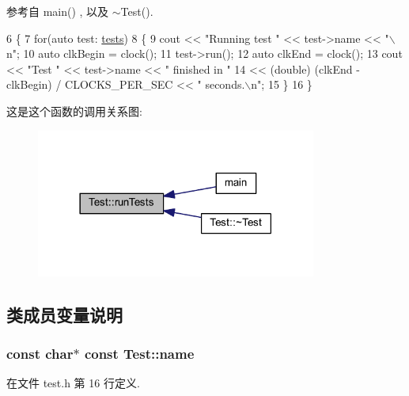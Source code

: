 参考自 main() , 以及 $\sim$\+Test().


\begin{DoxyCode}
6 \{
7     \textcolor{keywordflow}{for}(\textcolor{keyword}{auto} test: \hyperlink{classTest_ad03939a08980e2a62dd1d1cbcb13914c}{tests})
8     \{
9         cout << \textcolor{stringliteral}{"Running test "} << test->name << \textcolor{stringliteral}{"\(\backslash\)n"};
10         \textcolor{keyword}{auto} clkBegin = clock();
11         test->run();
12         \textcolor{keyword}{auto} clkEnd = clock();
13         cout << \textcolor{stringliteral}{"Test "} << test->name << \textcolor{stringliteral}{" finished in "}
14             << (double) (clkEnd - clkBegin) / CLOCKS\_PER\_SEC << \textcolor{stringliteral}{" seconds.\(\backslash\)n"};
15     \}
16 \}
\end{DoxyCode}


这是这个函数的调用关系图\+:
\nopagebreak
\begin{figure}[H]
\begin{center}
\leavevmode
\includegraphics[width=261pt]{classTest_a50697b06fcd7021c126a5bceceb6757c_icgraph}
\end{center}
\end{figure}




\subsection{类成员变量说明}
\subsubsection[{\texorpdfstring{name}{name}}]{\setlength{\rightskip}{0pt plus 5cm}const char$\ast$ const Test\+::name\hspace{0.3cm}{\ttfamily [protected]}}\hypertarget{classTest_a55a121f22f5a6365a27758307c0340fa}{}\label{classTest_a55a121f22f5a6365a27758307c0340fa}


在文件 test.\+h 第 16 行定义.

